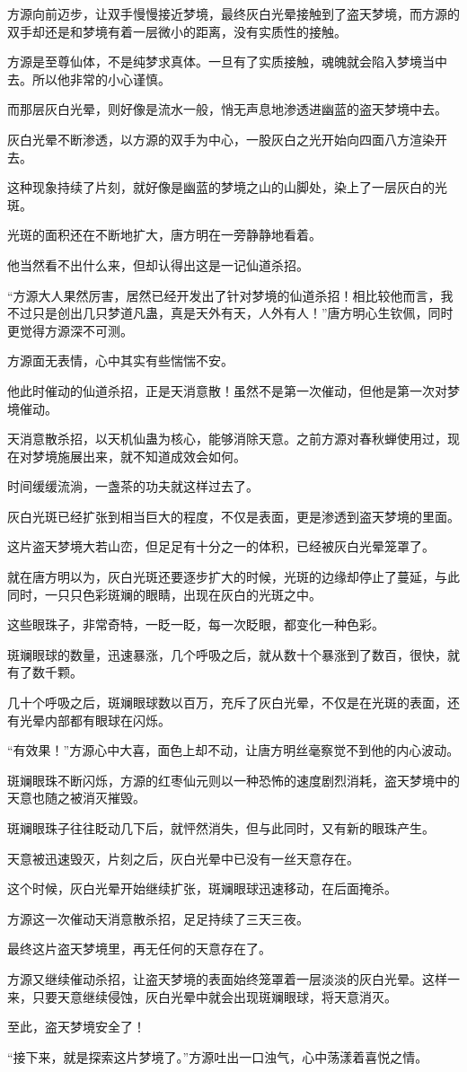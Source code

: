 \begin{this_body}
方源向前迈步，让双手慢慢接近梦境，最终灰白光晕接触到了盗天梦境，而方源的双手却还是和梦境有着一层微小的距离，没有实质性的接触。

方源是至尊仙体，不是纯梦求真体。一旦有了实质接触，魂魄就会陷入梦境当中去。所以他非常的小心谨慎。

而那层灰白光晕，则好像是流水一般，悄无声息地渗透进幽蓝的盗天梦境中去。

灰白光晕不断渗透，以方源的双手为中心，一股灰白之光开始向四面八方渲染开去。

这种现象持续了片刻，就好像是幽蓝的梦境之山的山脚处，染上了一层灰白的光斑。

光斑的面积还在不断地扩大，唐方明在一旁静静地看着。

他当然看不出什么来，但却认得出这是一记仙道杀招。

“方源大人果然厉害，居然已经开发出了针对梦境的仙道杀招！相比较他而言，我不过只是创出几只梦道凡蛊，真是天外有天，人外有人！”唐方明心生钦佩，同时更觉得方源深不可测。

方源面无表情，心中其实有些惴惴不安。

他此时催动的仙道杀招，正是天消意散！虽然不是第一次催动，但他是第一次对梦境催动。

天消意散杀招，以天机仙蛊为核心，能够消除天意。之前方源对春秋蝉使用过，现在对梦境施展出来，就不知道成效会如何。

时间缓缓流淌，一盏茶的功夫就这样过去了。

灰白光斑已经扩张到相当巨大的程度，不仅是表面，更是渗透到盗天梦境的里面。

这片盗天梦境大若山峦，但足足有十分之一的体积，已经被灰白光晕笼罩了。

就在唐方明以为，灰白光斑还要逐步扩大的时候，光斑的边缘却停止了蔓延，与此同时，一只只色彩斑斓的眼睛，出现在灰白的光斑之中。

这些眼珠子，非常奇特，一眨一眨，每一次眨眼，都变化一种色彩。

斑斓眼球的数量，迅速暴涨，几个呼吸之后，就从数十个暴涨到了数百，很快，就有了数千颗。

几十个呼吸之后，斑斓眼球数以百万，充斥了灰白光晕，不仅是在光斑的表面，还有光晕内部都有眼球在闪烁。

“有效果！”方源心中大喜，面色上却不动，让唐方明丝毫察觉不到他的内心波动。

斑斓眼珠不断闪烁，方源的红枣仙元则以一种恐怖的速度剧烈消耗，盗天梦境中的天意也随之被消灭摧毁。

斑斓眼珠子往往眨动几下后，就怦然消失，但与此同时，又有新的眼珠产生。

天意被迅速毁灭，片刻之后，灰白光晕中已没有一丝天意存在。

这个时候，灰白光晕开始继续扩张，斑斓眼球迅速移动，在后面掩杀。

方源这一次催动天消意散杀招，足足持续了三天三夜。

最终这片盗天梦境里，再无任何的天意存在了。

方源又继续催动杀招，让盗天梦境的表面始终笼罩着一层淡淡的灰白光晕。这样一来，只要天意继续侵蚀，灰白光晕中就会出现斑斓眼球，将天意消灭。

至此，盗天梦境安全了！

“接下来，就是探索这片梦境了。”方源吐出一口浊气，心中荡漾着喜悦之情。

\end{this_body}

